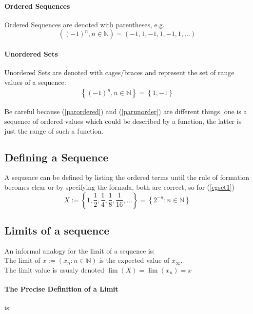 \documentclass[class=article, crop=false]{standalone}
\begin{document}
\paragraph{Ordered Sequences} Ordered Sequences are denoted with parentheses, e.g.
\begin{equation}
  ( (-1)^{n} , n \in \mathbb{N}) = (-1, 1, -1, 1, -1, 1, \dots)
  \label{parordered}
\end{equation}

\paragraph{Unordered Sets} Unordered Sets are denoted with cages/braces and represent the set of range values of a sequence:
\begin{align}
  \left\{ (-1)^n , n \in \mathbb{N} \right\} = \left\{ 1, -1 \right\}
  \label{parunorder}
\end{align}

Be careful because (\ref{parordered}) and (\ref{parunorder}) are different things, one is a sequence of ordered values which could be described by a function, the latter is just the range of such a function.

\subsection{Defining a Sequence}
A sequence can be defined by listing the ordered terms until the rule of formation becomes clear or by specifying the formula, both are correct, so for (\ref{egset1})
\begin{equation}
  X := \left\{ 1, \frac{1}{2}, \frac{1}{4}, \frac{1}{8}, \frac{1}{16}, \dots\right\} = \left\{ 2^{-n} : n \in \mathbb{N} \right\}
  \label{defineseq}
\end{equation}

\subsection{Limits of a sequence}
An informal analogy for the limit of a sequence is:\\

{\small The limit of $x:= \left( x_{n} : n \in \mathbb{N} \right)$ is the expected value of $x_{\infty}$.} \\

\noindent The limit value is usualy denoted $\lim\left( X \right) = \lim\left( x_{n} \right) = x$

\paragraph{The Precise Definition of a Limit} is:
\end{document}
